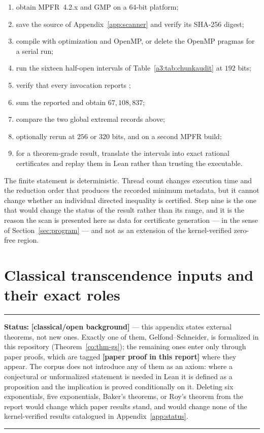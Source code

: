 \documentclass[11pt,oneside]{article}
\theoremstyle{definition}
\theoremstyle{remark}
\newcommand{\lean}[1]{\texttt{\detokenize{#1}}}
\newcommand{\statusnew}{\textcolor{newgreen}{\textbf{[paper proof in this report]}}}
\newcommand{\statusknown}{\textcolor{classicalgray}{\textbf{[classical/open background]}}}
\newenvironment{statusbox}[1]
{\begin{center}\begin{minipage}{0.94\textwidth}\raggedright\hbadness=10000\hrule
\vspace{0.45em}\textbf{Status:} #1\par\vspace{0.35em}}
{\vspace{0.35em}\hrule\end{minipage}\end{center}}
\begin{document}
\begin{enumerate}
\item obtain MPFR~4.2.x and GMP on a $64$-bit platform;
\item save the source of Appendix~\ref{app:scanner} and verify its SHA-256 digest;
\item compile with optimization and OpenMP, or delete the OpenMP pragmas for a serial run;
\item run the sixteen half-open intervals of Table~\ref{a3:tab:chunkaudit} at $192$ bits;
\item verify that every invocation reports \lean{failures=0};
\item sum the reported \lean{checked_nonpowers} and obtain $67{,}108{,}837$;
\item compare the two global extremal records above;
\item optionally rerun at $256$ or $320$ bits, and on a second MPFR build;
\item for a theorem-grade result, translate the intervals into exact rational certificates and
replay them in Lean rather than trusting the executable.
\end{enumerate}

The finite statement is deterministic.  Thread count changes execution time and the reduction
order that produces the recorded minimum metadata, but it cannot change whether an individual
directed inequality is certified.  Step nine is the one that would change the status of the
result rather than its range, and it is the reason the scan is presented here as data for
certificate generation --- in the sense of Section~\ref{sec:program} --- and not as an
extension of the kernel-verified zero-free region.

\section{Classical transcendence inputs and their exact roles}\label{app:classical}

\begin{statusbox}{\statusknown{} --- this appendix states external theorems, not new ones.
Exactly one of them, Gelfond--Schneider, is formalized in this repository
(Theorem~\ref{co:thm-gs}); the remaining ones enter only through paper proofs, which are
tagged \statusnew{} where they appear.  The corpus does not introduce any of them as an
axiom: where a conjectural or unformalized statement is needed in Lean it is defined as a
proposition and the implication is proved conditionally on it.  Deleting six exponentials,
five exponentials, Baker's theorems, or Roy's theorem from the report would change which
paper results stand, and would change none of the kernel-verified results catalogued in
Appendix~\ref{app:status}.}
\end{statusbox}
\end{document}
